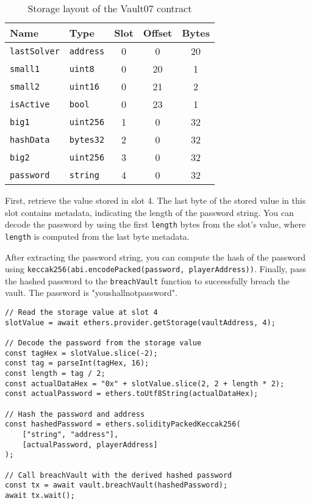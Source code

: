 \documentclass[12pt]{article}
\begin{document}
\begin{table}[h!]
    \centering
    \begin{tabular}{|l|l|c|c|c|}
        \hline
        \textbf{Name}      & \textbf{Type}    & \textbf{Slot} & \textbf{Offset} & \textbf{Bytes} \\ \hline
        \texttt{lastSolver} & \texttt{address} & 0             & 0               & 20             \\ \hline
        \texttt{small1}    & \texttt{uint8}   & 0             & 20              & 1              \\ \hline
        \texttt{small2}    & \texttt{uint16}  & 0             & 21              & 2              \\ \hline
        \texttt{isActive}  & \texttt{bool}    & 0             & 23              & 1              \\ \hline
        \texttt{big1}      & \texttt{uint256} & 1             & 0               & 32             \\ \hline
        \texttt{hashData}  & \texttt{bytes32} & 2             & 0               & 32             \\ \hline
        \texttt{big2}      & \texttt{uint256} & 3             & 0               & 32             \\ \hline
        \texttt{password}  & \texttt{string}  & 4             & 0               & 32             \\ \hline
    \end{tabular}
    \caption{Storage layout of the Vault07 contract}
    \label{tab:vault07_storage}
\end{table}


First, retrieve the value stored in slot 4. The last byte of the stored value in this slot contains metadata, indicating the length of the password string. You can decode the password by using the first \texttt{length} bytes from the slot's value, where \texttt{length} is computed from the last byte metadata.

After extracting the password string, you can compute the hash of the password using \texttt{keccak256(abi.encodePacked(password, playerAddress))}. Finally, pass the hashed password to the \texttt{breachVault} function to successfully breach the vault. The password is "youshallnotpassword".

\begin{verbatim}
// Read the storage value at slot 4
slotValue = await ethers.provider.getStorage(vaultAddress, 4);

// Decode the password from the storage value
const tagHex = slotValue.slice(-2);
const tag = parseInt(tagHex, 16);
const length = tag / 2;
const actualDataHex = "0x" + slotValue.slice(2, 2 + length * 2);
const actualPassword = ethers.toUtf8String(actualDataHex);

// Hash the password and address
const hashedPassword = ethers.solidityPackedKeccak256(
    ["string", "address"], 
    [actualPassword, playerAddress]
);

// Call breachVault with the derived hashed password
const tx = await vault.breachVault(hashedPassword);
await tx.wait();
\end{verbatim}
\end{document}
